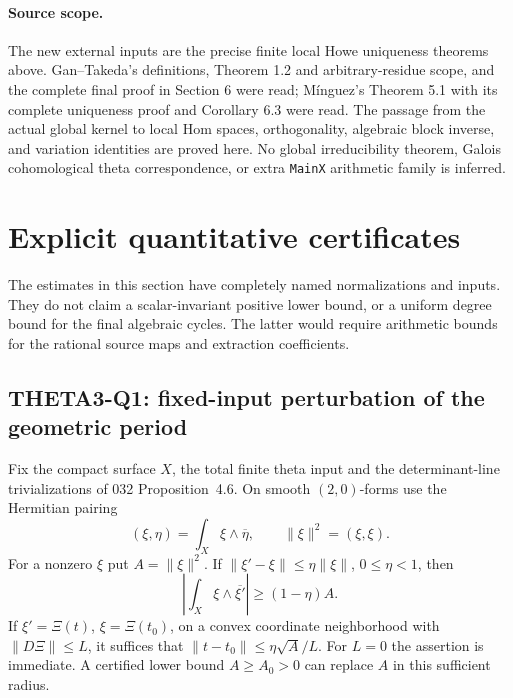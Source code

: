 \documentclass[11pt]{article}
\theoremstyle{definition}\newtheorem{definition}[theorem]{Definition}\newtheorem{remark}[theorem]{Remark}
\begin{document}
\paragraph{Source scope.}
The new external inputs are the precise finite local
Howe uniqueness theorems above.  Gan--Takeda's
definitions, Theorem 1.2 and arbitrary-residue scope,
and the complete final proof in Section 6 were
read; M\'inguez's Theorem 5.1 with its complete
uniqueness proof and Corollary 6.3 were read.
The passage from the actual global kernel to local
Hom spaces, orthogonality, algebraic block inverse,
and variation identities are proved here.
No global irreducibility theorem, Galois
cohomological theta correspondence, or extra
\texttt{MainX} arithmetic family is inferred.


\section{Explicit quantitative certificates}
\label{sec:quantitative}
The estimates in this section have completely named normalizations and inputs. They do not claim a scalar-invariant positive lower bound, or a uniform degree bound for the final algebraic cycles. The latter would require arithmetic bounds for the rational source maps and extraction coefficients.

\subsection{THETA3-Q1: fixed-input perturbation of the geometric period}\label{Q1}
Fix the compact surface $X$, the total finite theta input and the determinant-line trivializations of 032 Proposition~4.6. On smooth $(2,0)$-forms use the Hermitian pairing
\[
 (\xi,\eta)=\int_X\xi\wedge\overline\eta,
 \qquad \|\xi\|^2=(\xi,\xi).
\]
For a nonzero $\xi$ put $A=\|\xi\|^2$. If
$\|\xi'-\xi\|\leq\eta\|\xi\|$, $0\leq\eta<1$, then
\begin{equation}\label{eq:perturb}
 \left|\int_X\xi\wedge\overline{\xi'}\right|
 \geq (1-\eta)A.
\end{equation}
If $\xi'=\Xi(t)$, $\xi=\Xi(t_0)$, on a convex coordinate neighborhood with $\|D\Xi\|\leq L$, it suffices that
$\|t-t_0\|\leq\eta\sqrt A/L$. For $L=0$ the assertion is immediate. A certified lower bound $A\geq A_0>0$ can replace $A$ in this sufficient radius.
\end{document}
